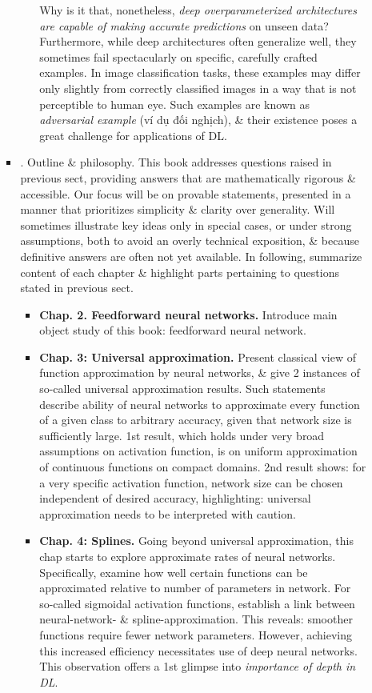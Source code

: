 \documentclass{article}
\begin{document}
\begin{enumerate}
\begin{itemize}
\begin{itemize}
\begin{itemize}
				Why is it that, nonetheless, {\it deep overparameterized architectures are capable of making accurate predictions} on unseen data? Furthermore, while deep architectures often generalize well, they sometimes fail spectacularly on specific, carefully crafted examples. In image classification tasks, these examples may differ only slightly from correctly classified images in a way that is not perceptible to human eye. Such examples are known as {\it adversarial example} (ví dụ đối nghịch), \& their existence poses a great challenge for applications of DL.
			\end{itemize}
			\item {. Outline \& philosophy.} This book addresses questions raised in previous sect, providing answers that are mathematically rigorous \& accessible. Our focus will be on provable statements, presented in a manner that prioritizes simplicity \& clarity over generality. Will sometimes illustrate key ideas only in special cases, or under strong assumptions, both to avoid an overly technical exposition, \& because definitive answers are often not yet available. In following, summarize content of each chapter \& highlight parts pertaining to questions stated in previous sect.
			\begin{itemize}
				\item {\bf Chap. 2. Feedforward neural networks.} Introduce main object study of this book: feedforward neural network.
				\item {\bf Chap. 3: Universal approximation.} Present classical view of function approximation by neural networks, \& give 2 instances of so-called universal approximation results. Such statements describe ability of neural networks to approximate every function of a given class to arbitrary accuracy, given that network size is sufficiently large. 1st result, which holds under very broad assumptions on activation function, is on uniform approximation of continuous functions on compact domains. 2nd result shows: for a very specific activation function, network size can be chosen independent of desired accuracy, highlighting: universal approximation needs to be interpreted with caution.
				\item {\bf Chap. 4: Splines.} Going beyond universal approximation, this chap starts to explore approximate rates of neural networks. Specifically, examine how well certain functions can be approximated relative to number of parameters in network. For so-called sigmoidal activation functions, establish a link between neural-network- \& spline-approximation. This reveals: smoother functions require fewer network parameters. However, achieving this increased efficiency necessitates use of deep neural networks. This observation offers a 1st glimpse into {\it importance of depth in DL}.

\end{itemize}
\end{itemize}
\end{itemize}
\end{enumerate}
\end{document}
